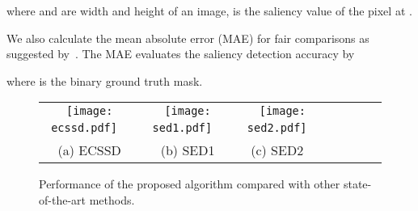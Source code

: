 \documentclass[10pt,twocolumn,letterpaper]{article}
\begin{document}
where  and  are width and height of an image,  is the saliency value of the pixel at
.


We also calculate the mean absolute error (MAE) for fair comparisons as suggested by~\cite{borji2015salient}.
The MAE evaluates the saliency detection accuracy by
\vspace{-1mm}

\vspace{-0.5mm}
where  is the binary ground truth mask.
\begin{figure*}
\begin{center}
\begin{tabular}{@{}c@{}c@{}c@{}c@{}c@{}c@{}c}
\texttt{[image: ecssd.pdf]} \ \quad\quad   &
\texttt{[image: sed1.pdf]} \ \quad\quad   &
\texttt{[image: sed2.pdf]} \ \\
 {\small(a) ECSSD} & {\small(b) SED1} & {\small(c) SED2} \ \\
\end{tabular}
\caption{Performance of the proposed algorithm compared with other state-of-the-art methods.
\label{fig:PR-curve}}
\end{center}
\end{figure*}
\setlength{\tabcolsep}{2.75pt}
\end{document}
